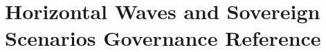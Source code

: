 \documentclass[11pt,a4paper]{book}
\newif\ifusebiblatex
\DeclareRobustCommand{\_}{\ifmmode\text{\symbol{95}}\else\symbol{95}\allowbreak\fi}
\theoremstyle{plain}
\theoremstyle{definition}
\begin{document}
\part{Horizontal Waves and Sovereign Scenarios Governance Reference}








\backmatter
\ifusebiblatex
    \printbibliography[heading=bibintoc]
\else
    \cleardoublepage
    
    
\fi
\end{document}
